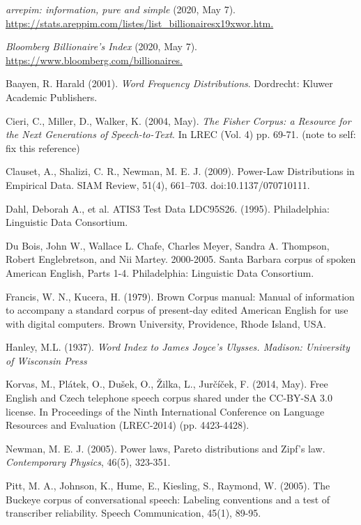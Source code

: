 \documentclass[12pt]{article}
\begin{document}
\begin{thebibliography}{9}

\emph{arrepim: information, pure and simple} (2020, May 7).\\ 
\url{https://stats.areppim.com/listes/list_billionairesx19xwor.htm.}


\emph{Bloomberg Billionaire's Index} (2020, May 7). \\
\url{https://www.bloomberg.com/billionaires.}

Baayen, R. Harald (2001).  \emph{Word Frequency Distributions}. Dordrecht: Kluwer Academic Publishers.

Cieri, C., Miller, D., Walker, K. (2004, May). \emph{The Fisher Corpus: a Resource for the Next Generations of Speech-to-Text}. In LREC (Vol. 4) pp. 69-71. (note to self: fix this reference)

Clauset, A., Shalizi, C. R., Newman, M. E. J. (2009). Power-Law Distributions in Empirical Data. SIAM Review, 51(4), 661–703. doi:10.1137/070710111.


Dahl, Deborah A., et al. ATIS3 Test Data LDC95S26. (1995). Philadelphia: Linguistic Data Consortium.

Du Bois, John W., Wallace L. Chafe, Charles Meyer, Sandra A. Thompson, Robert Englebretson, and Nii Martey. 2000-2005. Santa Barbara corpus of spoken American English, Parts 1-4. Philadelphia: Linguistic Data Consortium.

Francis, W. N., Kucera, H. (1979). Brown Corpus manual: Manual of information to accompany a standard corpus of present-day edited American English for use with digital computers. Brown University, Providence, Rhode Island, USA.

Hanley, M.L. (1937). \emph{Word Index to James Joyce's Ulysses. Madison: University of Wisconsin Press}

Korvas, M., Plátek, O., Dušek, O., Žilka, L., Jurčíček, F. (2014, May). Free English and Czech telephone speech corpus shared under the CC-BY-SA 3.0 license. In Proceedings of the Ninth International Conference on Language Resources and Evaluation (LREC-2014) (pp. 4423-4428).

Newman, M. E. J. (2005). Power laws, Pareto distributions and Zipf's law.  \emph{Contemporary Physics}, 46(5), 323-351.

Pitt, M. A., Johnson, K., Hume, E., Kiesling, S., Raymond, W. (2005). The Buckeye corpus of conversational speech: Labeling conventions and a test of transcriber reliability. Speech Communication, 45(1), 89-95.


\end{thebibliography}
\end{document}
